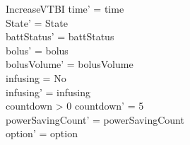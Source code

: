 \begin{schema}{IncreaseVTBI}
	time' = time\\ 
	State' = State\\
	battStatus' = battStatus\\
	bolus' = bolus\\
	\pagebreak
	bolusVolume' = bolusVolume\\
	infusing = No\\
	infusing' = infusing\\
	countdown > 0 \land countdown' = 5\\
	powerSavingCount' = powerSavingCount\\ option' = option\\
\end{schema}

